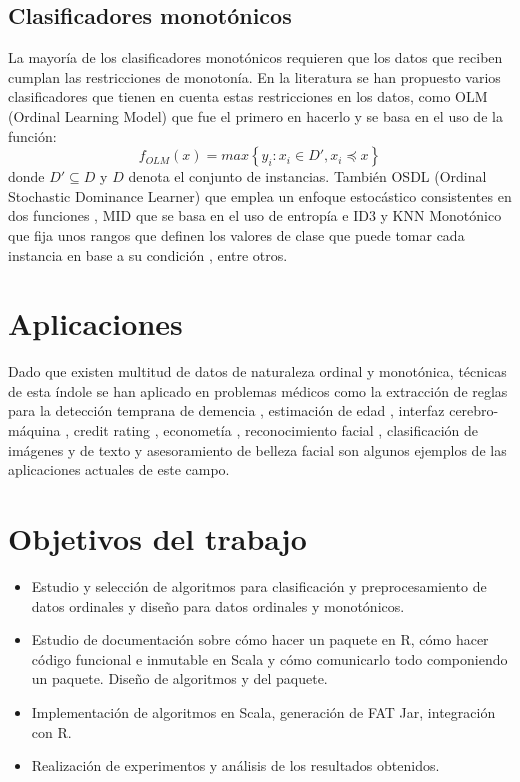 \subsection{Clasificadores monotónicos}
La mayoría de los clasificadores monotónicos requieren que los datos que reciben cumplan las restricciones de monotonía. En la literatura se han propuesto varios clasificadores que tienen en cuenta estas restricciones en los datos, como OLM (Ordinal Learning Model) \cite{ben1989learning} que fue el primero en hacerlo y se basa en el uso de la función: $$ f_{OLM}(x) = max \left\{ y_i: x_i \in D', x_i \preceq x \right\}$$ donde $D' \subseteq D $ y $D$ denota el conjunto de instancias. También OSDL (Ordinal Stochastic Dominance Learner) que emplea un enfoque estocástico consistentes en dos funciones \cite{lievens2008probabilistic}, MID que se basa en el uso de entropía e ID3 \cite{ben1995monotonicity} y KNN Monotónico que fija unos rangos que definen los valores de clase que puede tomar cada instancia en base a su condición \cite{duivesteijn2008nearest}, entre otros.
\section{Aplicaciones}
Dado que existen multitud de datos de naturaleza ordinal y monotónica, técnicas de esta índole se han aplicado en problemas médicos \cite{bender1997ordinal} como la extracción de reglas para la detección temprana de demencia \cite{pazzani2001acceptance}, estimación de edad \cite{chang2011ordinal}, interfaz cerebro-máquina \cite{yoon2011bayesian}, credit rating \cite{kwon1997ordinal}, econometía \cite{mathieson1996ordinal}, reconocimiento facial \cite{kim2010structured}, clasificación de imágenes \cite{tian2014comparative} y de texto \cite{baccianella2014feature} y asesoramiento de belleza facial \cite{yan2014cost} son algunos ejemplos de las aplicaciones actuales de este campo.

\section{Objetivos del trabajo}
\begin{itemize}
	\item Estudio y selección de algoritmos para clasificación y preprocesamiento de datos ordinales y diseño para datos ordinales y monotónicos.
	\item Estudio de documentación sobre cómo hacer un paquete en R, cómo hacer código funcional e inmutable en Scala y cómo comunicarlo todo componiendo un paquete. Diseño de algoritmos y del paquete.
	\item Implementación de algoritmos en Scala, generación de FAT Jar, integración con R.
	\item Realización de experimentos y análisis de los resultados obtenidos.
\end{itemize}

